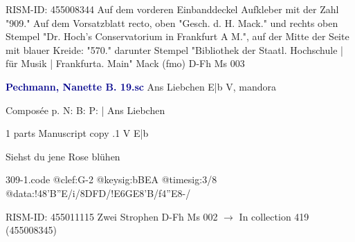 \documentclass[twocolumn]{book}
\begin{document}
\newline RISM-ID: 455008344
\newline Auf dem vorderen Einbanddeckel Aufkleber mit der Zahl "909."
\newline Auf dem Vorsatzblatt recto, oben "Gesch. d. H. Mack." und rechts oben Stempel "Dr. Hoch's Conservatorium in Frankfurt A M.", auf der Mitte der Seite mit blauer Kreide: "570." darunter Stempel "Bibliothek der Staatl. Hochschule | für Musik | Frankfurta. Main"
\newline Mack  (fmo)
\newline D-Fh  Ms 003
\newline \par \vspace{7pt} \textcolor{darkblue}{\textbf{Pechmann, Nanette B.  19.sc}}
\newline Ans Liebchen  E|b  
\newline V, mandora
\newline \begin{itshape}[heading, f.40v:] Composée p. N: B: P: | Ans Liebchen\end{itshape} 
\newline \textcolor{darkblue}{}  1 parts  
\newline Manuscript copy
.1  V  E|b
\newline \begin{footnotesize} Siehst du jene Rose blühen \end{footnotesize}  
\begin{filecontents*}{309-1.code}
@clef:G-2
@keysig:bBEA
@timesig:3/8
@data:!48'B''E/i/{8DFD}/!E{6GE}8'B/f4''E8-/
\end{filecontents*}
\newline
%

\newline RISM-ID: 455011115
\newline Zwei Strophen
\newline D-Fh  Ms 002
\newline $\rightarrow$ In collection 419 (455008345)
\end{document}
